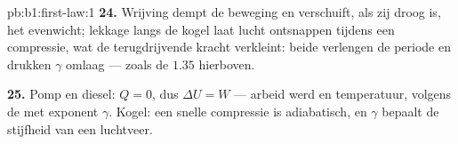 \begin{solution}{pb:b1:first-law:1}
\textbf{24.} Wrijving dempt de beweging en verschuift, als zij droog is, het
evenwicht; lekkage langs de kogel laat lucht ontsnappen tijdens een compressie,
wat de terugdrijvende kracht verkleint: beide verlengen de periode en drukken
$\gamma$ omlaag --- zoals de $1.35$ hierboven.

\textbf{25.} Pomp en diesel: $Q = 0$, dus $\Delta U = W$ --- arbeid werd
 en temperatuur, volgens de  met exponent
$\gamma$. Kogel: een snelle compressie is adiabatisch, en $\gamma$ bepaalt de
stijfheid van een luchtveer.
\end{solution}
